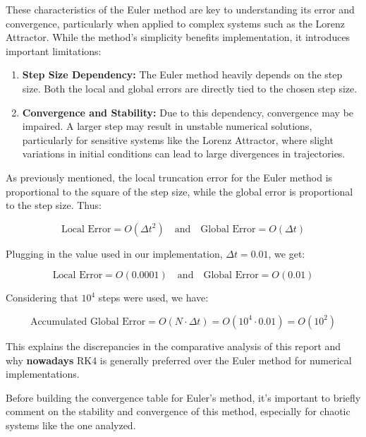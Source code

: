 \documentclass[12pt, a4paper]{article}
\begin{document}
	These characteristics of the Euler method are key to understanding its error and convergence, particularly when applied to complex systems such as the Lorenz Attractor. While the method’s simplicity benefits implementation, it introduces important limitations:
	
	\begin{enumerate}
		\item \textbf{Step Size Dependency:} The Euler method heavily depends on the step size. Both the local and global errors are directly tied to the chosen step size.
		      
		\item \textbf{Convergence and Stability:} Due to this dependency, convergence may be impaired. A larger step may result in unstable numerical solutions, particularly for sensitive systems like the Lorenz Attractor, where slight variations in initial conditions can lead to large divergences in trajectories.
	\end{enumerate}
	
	As previously mentioned, the local truncation error for the Euler method is proportional to the square of the step size, while the global error is proportional to the step size. Thus:
	
	\begin{equation*}
		\text{Local Error} = O(\Delta t^2) \quad \text{and} \quad \text{Global Error} = O(\Delta t)
	\end{equation*}
	
	Plugging in the value used in our implementation, $\Delta t = 0.01$, we get:
	
	\begin{equation*}
		\text{Local Error} = O(0.0001) \quad \text{and} \quad \text{Global Error} = O(0.01)
	\end{equation*}
	
	Considering that $10^4$ steps were used, we have:
	
	\begin{equation*}
		\text{Accumulated Global Error} = O(N \cdot \Delta t) = O(10^4 \cdot 0.01) = O(10^2)
	\end{equation*}
	
	This explains the discrepancies in the comparative analysis of this report and why \textbf{nowadays} RK4 is generally preferred over the Euler method for numerical implementations.
	
	Before building the convergence table for Euler’s method, it's important to briefly comment on the stability and convergence of this method, especially for chaotic systems like the one analyzed.
	
\end{document}
